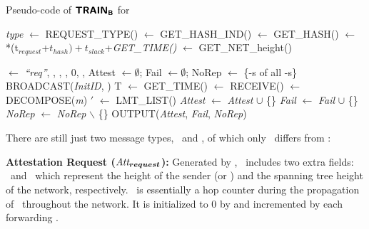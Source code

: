  
 \begin{algorithm}[hbt!]
\footnotesize
 \caption{Pseudo-code of $\boldsymbol{{\sf{TRAIN_{B}}}}$ for \vrf}\label{alg:nortc_vrf}
     \begin{algorithmic}[1]
         \State \textit{type} $\gets$ REQUEST\_TYPE() 
         \State \hashind $\gets$ GET\_HASH\_IND()
         \State \hash $\gets$ GET\_HASH(\hashind)
         \State \attesttime $\gets$ \textit{\netheight}*(t$_{request}$+$t_{hash})+t_{slack}$+\textit{GET\_TIME()}
         \State \netheight $\gets$ GET\_NET\_height()
    
         \State \Attreq $\gets$ \textit{``req''}, \vrf, \hashind, \hash, 0, \netheight, \attesttime
         \State Attest $\gets \emptyset$; Fail $\gets \emptyset$; NoRep $\gets$ \{\devid-s of all \prv-s\}
         \State BROADCAST(\textit{InitID}, \Attreq)
         \State T $\gets$ GET\_TIME()
             \State \Attrep $\gets$ RECEIVE()
             \State [\devid, \parent, \attesttime, \hash, \{\lmt\}, \Authrep] $\gets$ DECOMPOSE(\textit{\textit{m}})
             \State \lmt$'$ $\gets$ LMT\_LIST(\devid) 
                     \State \textit{Attest} $\gets$ \textit{Attest} $\cup$ \{\devid\}
                 \Else
                     \State \textit{Fail} $\gets$ \textit{Fail} $\cup$ \{\devid\}
                 \EndIf
             \State \textit{NoRep} $\gets$ \textit{NoRep} $\backslash$ \{\devid\}
             \EndIf
        \EndWhile
        \State OUTPUT(\textit{Attest}, \textit{Fail}, \textit{NoRep})
     \EndWhile
     \end{algorithmic}
 \end{algorithm} 

There are still just two message types, \Attreq\ and \Attrep, 
of which only \Attreq\ differs from \trapsrtc:
%

\noindent \textbf{Attestation Request ($\boldsymbol{\textit{Att$_{request}$}}$):} Generated by \vrf, \Attreq\ includes two extra fields: \height\ and \netheight\ 
which represent the height of the sender (\vrf or \prv) and the spanning tree height of the network,
respectively. \height\ is essentially a hop counter during the propagation of \Attreq\ 
throughout the network. It is initialized to 0 by \vrf and incremented by each forwarding \prv.
%

